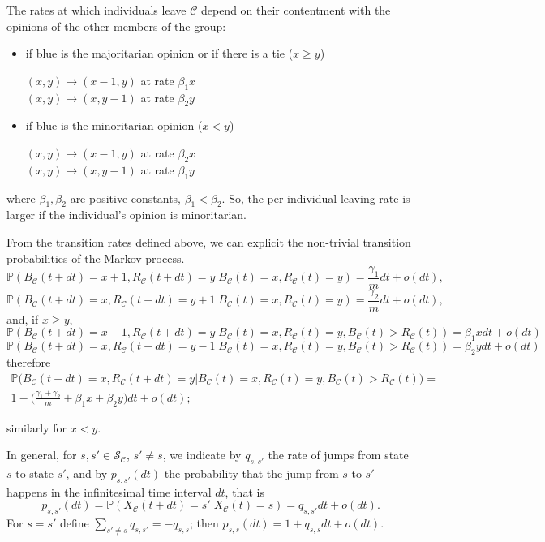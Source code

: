 \documentclass{article}
\theoremstyle{remark}
\newtheorem*{partial proof}{Partial proof of the Conjecture}
\begin{document}
The rates at which individuals leave $\mathcal{C}$ depend on their contentment with the opinions of the other members of the group:
\begin{itemize}
    \item if blue is the majoritarian opinion or if there is a tie ($x\geq y$)
    \begin{center}
        $(x,y) \to (x-1,y)$ at rate $\beta_1 x$\\
        $(x,y) \to (x,y-1)$ at rate $\beta_2 y$
    \end{center}
    \item if blue is the minoritarian opinion ($x<y$)
    \begin{center}
        $(x,y) \to (x-1,y)$ at rate $\beta_2 x$\\
        $(x,y) \to (x,y-1)$ at rate $\beta_1 y$
    \end{center}
\end{itemize}
where $\beta_1,\beta_2$ are positive constants, $\beta_1<\beta_2$. So, the per-individual leaving rate is larger if the individual's opinion is minoritarian.


From the transition rates defined above, we can explicit the non-trivial transition probabilities of the Markov process.
$$
\mathbb{P}(B_\mathcal{C}(t+dt)=x+1, R_\mathcal{C}(t+dt)=y \lvert B_\mathcal{C}(t)=x, R_\mathcal{C}(t)=y)= \frac{\gamma_1}{m}dt+ o(dt),
$$
$$
\mathbb{P}(B_\mathcal{C}(t+dt)=x, R_\mathcal{C}(t+dt)=y+1 \lvert B_\mathcal{C}(t)=x, R_\mathcal{C}(t)=y)= \frac{\gamma_2}{m}dt+ o(dt),
$$
and, if $x\geq y$,
$$
\mathbb{P}(B_\mathcal{C}(t+dt)=x-1, R_\mathcal{C}(t+dt)=y \lvert B_\mathcal{C}(t)=x, R_\mathcal{C}(t)=y, B_\mathcal{C}(t)>R_\mathcal{C}(t))= \beta_1 x dt+ o(dt)
$$
$$
\mathbb{P}(B_\mathcal{C}(t+dt)=x, R_\mathcal{C}(t+dt)=y-1 \lvert B_\mathcal{C}(t)=x, R_\mathcal{C}(t)=y, B_\mathcal{C}(t)>R_\mathcal{C}(t))= \beta_2 y dt+ o(dt)
$$
therefore
\begin{align*}
 \mathbb{P}\big(B_\mathcal{C}(t+dt)= x, R_\mathcal{C}(t+dt)=y \lvert B_\mathcal{C}(t)=x, R_\mathcal{C}(t)=y, B_\mathcal{C}(t)>R_\mathcal{C}(t)\big)=\\
 1-\Big(\frac{\gamma_1+\gamma_2}{m}+\beta_1 x +\beta_2 y \Big) dt+ o(dt);
\end{align*}

similarly for $x<y$.

In general, for $s,s' \in\mathcal{S}_{\mathcal{C}}$, $s'\neq s$, we indicate by $q_{s,s'}$ the rate of jumps from state $s$ to state $s'$, and by $p_{s,s'}(dt)$ the probability that the jump from $s$ to $s'$ happens in the infinitesimal time interval $dt$, that is
$$
p_{s,s'}(dt)=\mathbb{P}(X_\mathcal{C}(t+dt)=s' \lvert X_\mathcal{C}(t)=s) = q_{s,s'}dt + o(dt).
$$
For $s=s'$ define $\sum_{s' \neq s}q_{s,s'}=-q_{s,s}$; then $p_{s,s}(dt)=1+q_{s,s}dt+o(dt)$.
\end{document}
